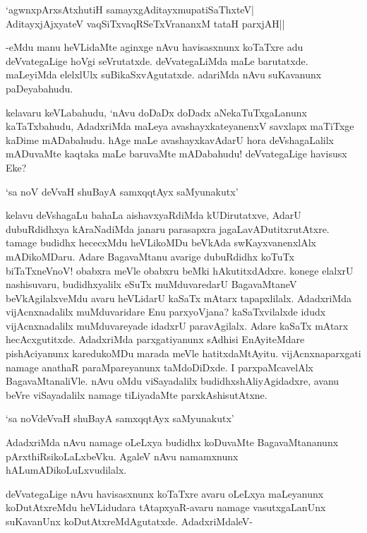 \begin{shloka}
`agwnxpArxsAtxhutiH samayxgAditayxmupatiSaThxteV|\\
AditayxjAjxyateV vaqSiTxvaqRSeTxVrananxM tataH parxjAH||
\end{shloka}

-eMdu manu heVLidaMte aginxge nAvu havisasxnunx koTaTxre adu deVvategaLige hoVgi seVrutatxde. deVvategaLiMda maLe barutatxde. maLeyiMda elelxlUlx suBikaSxvAgutatxde. adariMda nAvu suKavanunx paDeyabahudu.

kelavaru keVLabahudu, `nAvu doDaDx doDadx aNekaTuTxgaLanunx kaTaTxbahudu, AdadxriMda maLeya avashayxkateyanenxV savxlapx maTiTxge kaDime mADabahudu. hAge maLe avashayxkavAdarU hora deVshagaLalilx mADuvaMte kaqtaka maLe baruvaMte mADabahudu! deVvategaLige havisusx Eke?

\begin{shloka}
`sa noV deVvaH shuBayA samxqqtAyx saMyunakutx'
\end{shloka}

kelavu deVshagaLu bahaLa aishavxyaRdiMda kUDirutatxve, AdarU dubuRdidhxya kAraNadiMda janaru parasapxra jagaLavADutitxrutAtxre. tamage budidhx hececxMdu heVLikoMDu beVkAda swKayxvanenxlAlx mADikoMDaru. Adare BagavaMtanu avarige dubuRdidhx koTuTx biTaTxneVnoV! obabxra meVle obabxru beMki hAkutitxdAdxre. konege elalxrU nashisuvaru, budidhxyalilx eSuTx muMduvaredarU BagavaMtaneV beVkAgilalxveMdu avaru heVLidarU kaSaTx mAtarx tapapxlilalx. AdadxriMda vijAcnxnadalilx muMduvaridare Enu parxyoVjana? kaSaTxvilalxde idudx vijAcnxnadalilx muMduvareyade idadxrU paravAgilalx. Adare kaSaTx mAtarx hecAcxgutitxde. AdadxriMda parxgatiyanunx sAdhisi EnAyiteMdare pishAciyanunx karedukoMDu marada meVle hatitxdaMtAyitu. vijAcnxnaparxgati namage anathaR paraMpareyanunx taMdoDiDxde. I parxpaMcavelAlx BagavaMtanaliVle. nAvu oMdu viSayadalilx budidhxshAliyAgidadxre, avanu beVre viSayadalilx namage tiLiyadaMte parxkAshisutAtxne.

\begin{shloka}
`sa noVdeVvaH shuBayA samxqqtAyx saMyunakutx'
\end{shloka} 

AdadxriMda nAvu namage oLeLxya budidhx koDuvaMte BagavaMtananunx pArxthiRsikoLaLxbeVku. AgaleV nAvu namamxnunx hALumADikoLuLxvudilalx.

deVvategaLige nAvu havisasxnunx koTaTxre avaru oLeLxya maLeyanunx koDutAtxreMdu heVLidudara tAtapxyaR-avaru namage vasutxgaLanUnx suKavanUnx koDutAtxreMdAgutatxde. AdadxriMdaleV-

